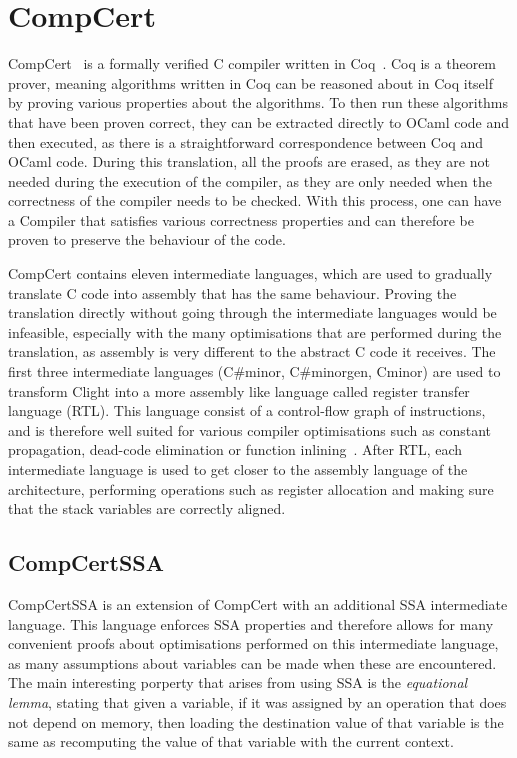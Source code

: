 \section{CompCert}%
\label{sec:bg:compcert}

\gls{CompCert}~\cite{leroy09_formal_verif_compil_back_end} is a formally
verified C compiler written in
Coq~\cite{bertot04_inter_theor_provin_progr_devel}.  Coq is a theorem prover,
meaning algorithms written in Coq can be reasoned about in Coq itself by proving
various properties about the algorithms.  To then run these algorithms that have
been proven correct, they can be extracted directly to OCaml code and then
executed, as there is a straightforward correspondence between Coq and OCaml
code.  During this translation, all the proofs are erased, as they are not
needed during the execution of the compiler, as they are only needed when the
correctness of the compiler needs to be checked.  With this process, one can
have a Compiler that satisfies various correctness properties and can therefore
be proven to preserve the behaviour of the code.

CompCert contains eleven intermediate languages, which are used to gradually
translate C code into assembly that has the same behaviour.  Proving the
translation directly without going through the intermediate languages would be
infeasible, especially with the many optimisations that are performed during the
translation, as assembly is very different to the abstract C code it receives.
The first three intermediate languages (C\#minor, C\#minorgen, Cminor) are used
to transform Clight into a more assembly like language called register transfer
language (RTL).  This language consist of a control-flow graph of instructions,
and is therefore well suited for various compiler optimisations such as constant
propagation, dead-code elimination or function
inlining~\cite{tristan08_formal_verif_trans_valid}.  After RTL, each
intermediate language is used to get closer to the assembly language of the
architecture, performing operations such as register allocation and making sure
that the stack variables are correctly aligned.

\subsection{CompCertSSA}%
\label{sec:bg:compcertssa}

CompCertSSA is an extension of CompCert with an additional
\gls{SSA} intermediate language.  This language enforces \gls{SSA} properties
and therefore allows for many convenient proofs about optimisations performed on
this intermediate language, as many assumptions about variables can be made when
these are encountered.  The main interesting porperty that arises from using
\gls{SSA} is the \emph{equational lemma}, stating that given a variable, if it
was assigned by an operation that does not depend on memory, then loading the
destination value of that variable is the same as recomputing the value of that
variable with the current context.

